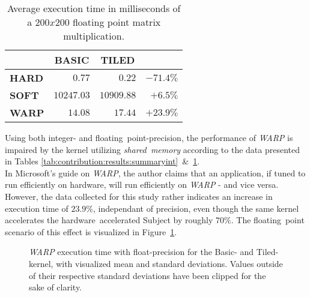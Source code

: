 \documentclass[fleqn,10pt]{SelfArx} %
\begin{document}
\begin{table}[hbt]
\begin{center}
\begin{tabular}{r|r|r|r|}
	\cline{2-3}
							& \multicolumn{1}{|c|}{\textbf{BASIC}} & \multicolumn{1}{|c|}{\textbf{TILED}}	\\ \hline
	\multicolumn{1}{|l|}{\textbf{HARD}}	& $0.77$			& $0.22$		& $-71.4\%$    				\\ \hline
	\multicolumn{1}{|l|}{\textbf{SOFT}}	& $10247.03$		& $10909.88$	& $+6.5\%$     				\\ \hline
	\multicolumn{1}{|l|}{\textbf{WARP}}	& $14.08$			& $17.44$		& $+23.9\%$    				\\ \hline
\end{tabular}
\end{center}
\caption{Average execution time in milliseconds of a $200x200$ floating point matrix multiplication.}
\label{tab:contribution:results:summaryfloat}
\end{table}

\noindent
Using both integer- and floating~point-precision, the performance of \textit{WARP} is impaired by the kernel utilizing \textit{shared~memory} according to the data presented in Tables \ref{tab:contribution:results:summaryint}~\&~\ref{tab:contribution:results:summaryfloat}.\\
In Microsoft's guide on \textit{WARP}, the author claims that an application, if tuned to run efficiently on hardware, will run efficiently on \textit{WARP} - and vice versa. However, the data collected for this study rather indicates an increase in execution time of $23.9\%$, independant of precision, even though the same kernel accelerates the hardware~accelerated Subject by roughly $70\%$. The floating~point scenario of this effect is visualized in Figure~\ref{fig:contribution:results:warp:msswarp}.

\begin{figure}[htb]
\begin{center}
	\resizebox{ \columnwidth }{!}{}
	\caption{\textit{WARP} execution time with float-precision for the Basic- and Tiled-kernel, with visualized mean and standard deviations. Values outside of their respective standard deviations have been clipped for the sake of clarity.}
	\label{fig:contribution:results:warp:msswarp}
\end{center}
\end{figure}
\end{document}
